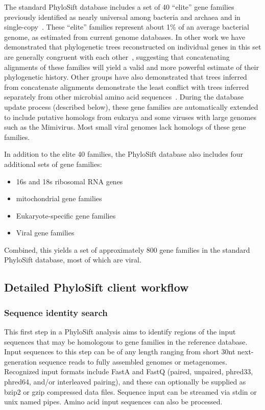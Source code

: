 \documentclass[10pt]{article}
\begin{document}
The standard PhyloSift database includes a set of 40 ``elite'' gene families previously identified as nearly universal among bacteria and archaea and in single-copy~\cite{DongyingWu2012}.
These ``elite'' families represent about 1\% of an average bacterial genome, as estimated from current genome databases.
In other work we have demonstrated that phylogenetic trees reconstructed on individual genes in this set are generally congruent with each other~\cite{Lang2012}, suggesting that concatenating alignments of these families will yield a valid and more powerful estimate of their phylogenetic history.
Other groups have also demonstrated that trees inferred from concatenate alignments demonstrate the least conflict with trees inferred separately from other microbial amino acid sequences~\cite{Abby2012}.
During the database update process (described below), these gene families are automatically extended to include putative homologs from eukarya and some viruses with large genomes such as the Mimivirus.
Most small viral genomes lack homologs of these gene families.

In addition to the elite 40 families, the PhyloSift database also includes four additional sets of gene families:
\begin{itemize}
\item 16s and 18s ribosomal {RNA} genes
\item mitochondrial gene families
\item Eukaryote-specific gene families
\item Viral gene families
\end{itemize}
Combined, this yields a set of approximately 800 gene families in the standard PhyloSift database, most of which are viral.

\subsection*{Detailed PhyloSift client workflow}
\subsubsection*{Sequence identity search}
This first step in a PhyloSift analysis aims to identify regions of the input sequences that may be homologous to gene families in the reference database.
Input sequences to this step can be of any length ranging from short 30nt next-generation sequence reads to fully assembled genomes or metagenomes.
Recognized input formats include FastA and FastQ (paired, unpaired, phred33, phred64, and/or interleaved pairing), and these can optionally be supplied as bzip2 or gzip compressed data files.
Sequence input can be streamed via stdin or unix named pipes.
Amino acid input sequences can also be processed.
\end{document}
